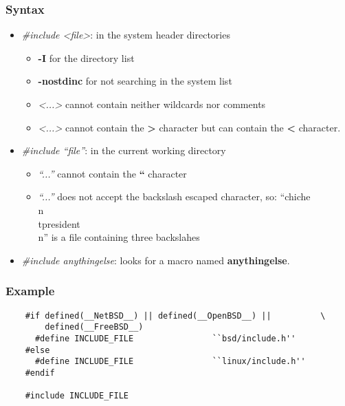 \documentclass[9pt]{beamer}
\begin{document}
\begin{frame}
  \frametitle{Syntax}

  \begin{itemize}
    \item<1->
      \textit{\#include <file>}: in the system header directories

      \begin{itemize}
	\item
	  \textbf{-I} for the directory list
	\item
	  \textbf{-nostdinc} for not searching in the system list
	\item
	  \textit{<...>} cannot contain neither wildcards nor comments
	\item
	  \textit{<...>} cannot contain the \textbf{>} character but
	  can contain the \textbf{<} character.
      \end{itemize}

    \item<2->
      \textit{\#include ``file''}: in the current working directory

      \begin{itemize}
	\item
	  \textit{``...''} cannot contain the \textbf{``} character
	\item
	  \textit{``...''} does not accept the backslash escaped character,
	  so: ``chiche\\n\\tpresident\\n'' is a file containing
	  three backslahes
      \end{itemize}

    \item<3->
      \textit{\#include anythingelse}: looks for a macro named
      \textbf{anythingelse}.
  \end{itemize}
\end{frame}


\begin{frame}[containsverbatim]
  \frametitle{Example}

  \begin{verbatim}
    #if defined(__NetBSD__) || defined(__OpenBSD__) ||          \
        defined(__FreeBSD__)
      #define INCLUDE_FILE                ``bsd/include.h''
    #else
      #define INCLUDE_FILE                ``linux/include.h''
    #endif

    #include INCLUDE_FILE
  \end{verbatim}
\end{frame}
\end{document}
